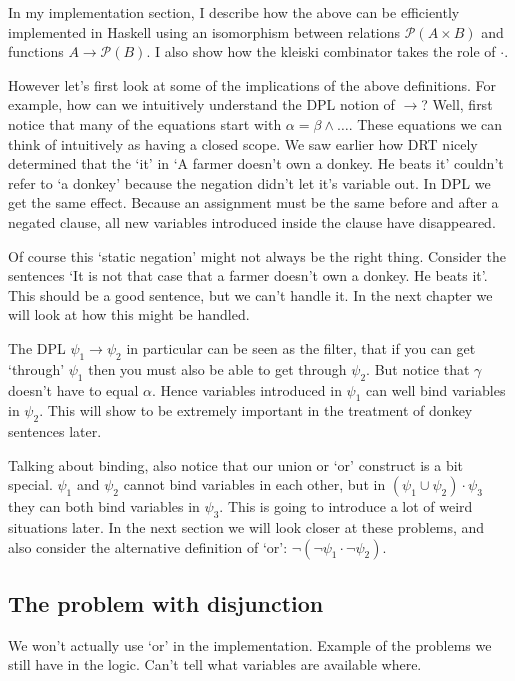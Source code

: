 \documentclass[12pt]{article}
\begin{document}
In my implementation section, I describe how the above can be efficiently implemented in Haskell using an isomorphism between relations $\mathcal{P}(A\times B)$ and functions $A\to\mathcal{P}(B)$. I also show how the kleiski combinator takes the role of $\cdot$.

However let's first look at some of the implications of the above definitions. For example, how can we intuitively understand the DPL notion of $\rightarrow$? Well, first notice that many of the equations start with $\alpha=\beta\wedge\dots$. These equations we can think of intuitively as having a closed scope. We saw earlier how DRT nicely determined that the `it' in `A farmer doesn't own a donkey. He beats it' couldn't refer to `a donkey' because the negation didn't let it's variable out. In DPL we get the same effect. Because an assignment must be the same before and after a negated clause, all new variables introduced inside the clause have disappeared.

Of course this `static negation' might not always be the right thing. Consider the sentences `It is not that case that a farmer doesn't own a donkey. He beats it'. This should be a good sentence, but we can't handle it. In the next chapter we will look at how this might be handled.

The DPL $\psi_1\rightarrow\psi_2$ in particular can be seen as the filter, that if you can get `through' $\psi_1$ then you must also be able to get through $\psi_2$. But notice that $\gamma$ doesn't have to equal $\alpha$. Hence variables introduced in $\psi_1$ can well bind variables in $\psi_2$. This will show to be extremely important in the treatment of donkey sentences later.

Talking about binding, also notice that our union or `or' construct is a bit special. $\psi_1$ and $\psi_2$ cannot bind variables in each other, but in $(\psi_1\cup\psi_2)\cdot\psi_3$ they can both bind variables in $\psi_3$. This is going to introduce a lot of weird situations later. In the next section we will look closer at these problems, and also consider the alternative definition of `or': $\neg(\neg\psi_1\cdot\neg\psi_2)$.

\subsection{The problem with disjunction}

We won't actually use `or' in the implementation.
Example of the problems we still have in the logic.
Can't tell what variables are available where.
\end{document}
